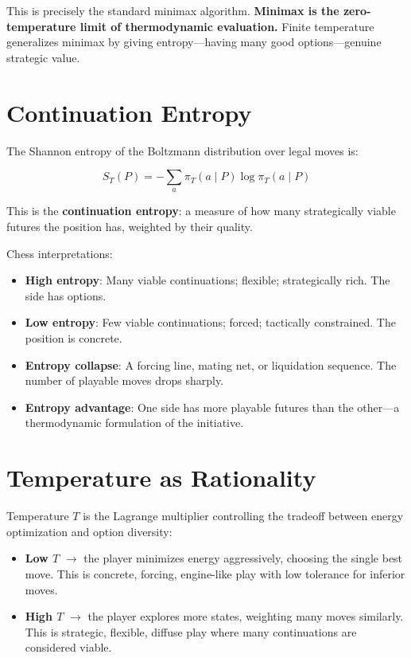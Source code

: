 \documentclass[11pt,a4paper]{article}
\begin{document}
This is precisely the standard minimax algorithm. \textbf{Minimax is the
zero-temperature limit of thermodynamic evaluation.} Finite temperature
generalizes minimax by giving entropy---having many good options---genuine
strategic value.

\section{Continuation Entropy}

The Shannon entropy of the Boltzmann distribution over legal moves is:

\begin{equation}
S_T(P) = -\sum_{a} \pi_T(a \mid P) \log \pi_T(a \mid P)
\end{equation}

This is the \textbf{continuation entropy}: a measure of how many
strategically viable futures the position has, weighted by their quality.

Chess interpretations:

\begin{itemize}[nosep]
\item \textbf{High entropy}: Many viable continuations; flexible;
  strategically rich. The side has options.
\item \textbf{Low entropy}: Few viable continuations; forced; tactically
  constrained. The position is concrete.
\item \textbf{Entropy collapse}: A forcing line, mating net, or
  liquidation sequence. The number of playable moves drops sharply.
\item \textbf{Entropy advantage}: One side has more playable futures
  than the other---a thermodynamic formulation of the initiative.
\end{itemize}

\section{Temperature as Rationality}

Temperature $T$ is the Lagrange multiplier controlling the tradeoff
between energy optimization and option diversity:

\begin{itemize}[nosep]
\item \textbf{Low $T$} $\to$ the player minimizes energy aggressively,
  choosing the single best move. This is concrete, forcing, engine-like
  play with low tolerance for inferior moves.
\item \textbf{High $T$} $\to$ the player explores more states, weighting
  many moves similarly. This is strategic, flexible, diffuse play where
  many continuations are considered viable.
\end{itemize}
\end{document}
